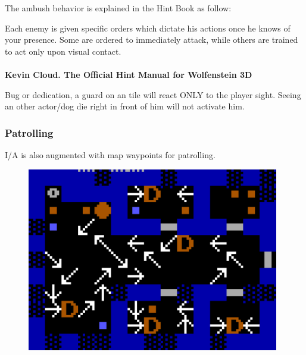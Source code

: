 \par

 The ambush behavior is explained in the Hint Book as follow:\\
\par
\begin{fancyquotes}
Each enemy is given specific orders which dictate his actions once he knows of your presence. Some are ordered to immediately attack, while others are trained to act only upon visual contact.
 \bigskip \\
\bigskip \\
\textbf{Kevin Cloud. The Official Hint Manual for Wolfenstein 3D}
 \end{fancyquotes}
\par
{} Bug or dedication, a guard on an  tile will react ONLY to the player sight. Seeing an other actor/dog die right in front of him will not activate him.\\


\subsubsection{Patrolling}
I/A is also augmented with map waypoints for patrolling.\\
\par
{}
\par
\begin{figure}[H]
 \centering
 \includegraphics[width=0.98\textwidth]{imgs/drawings/path.png}
\end{figure}
\par








